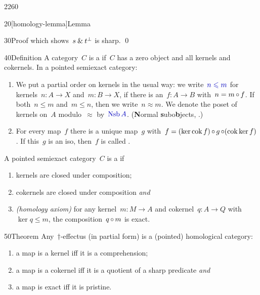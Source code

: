 \begin{parsec}{2260}
\begin{point}{20}[homology-lemma]{Lemma}
\begin{point}{30}{Proof}
    which shows~$s \mathbin{\&} t^\perp$ is sharp. \qed
\end{point}
\end{point}
\begin{point}{40}{Definition}%
A category~$C$ is a  \cite[\S1.1]{grandis}
    if~$C$ has a zero object and all kernels and cokernels.
In a pointed semiexact category:
\begin{enumerate}
\item
We put a partial order on kernels in the usual way:
we write~$\Define{n \leq m}$
for kernels~$n\colon A \to X$ and~$m \colon B \to X$,
    if there is an~$f\colon A \to B$
    with~$n = m \mathop{\circ} f$.
If both~$n \leq m$ and~$m \leq n$,
    then we write~$n \approx m$.
We denote the poset of kernels on~$A$ modulo~$\approx$
        by~$\Define{\Nsb A}$. (\textbf{N}ormal \textbf{s}ubo\textbf{b}jects,
            \cite[\S1.5]{grandis}.)
\item
For every map~$f$
    there is a unique map~$g$
        with~$f = (\ker \operatorname{cok} f ) \mathop{\circ} g \mathop{\circ} (\operatorname{cok} \ker f)$.
    If this~$g$ is an iso, then~$f$ is called .
\end{enumerate}
A pointed semiexact category~$C$
    is a  if
\begin{enumerate}
    \item kernels are closed under composition;
    \item cokernels are closed under composition \emph{and}
    \item \emph{(homology axiom)}
        for any kernel~$m\colon M \to A$
        and cokernel~$q\colon A \to Q$
        with~$\ker q \leq m$,
        the composition~$q \mathop{\circ} m$ is exact.
\end{enumerate}
\end{point}
\begin{point}{50}{Theorem}%
Any~$\dagger$-effectus (in partial form) is a (pointed) homological category:
\begin{enumerate}
    \item 
        a map is a kernel iff it is a comprehension;
    \item
        a map is a cokernel iff it is a quotient of a sharp predicate \emph{and}
    \item
        a map is exact iff it is pristine.
\end{enumerate}

\end{point}
\end{parsec}
